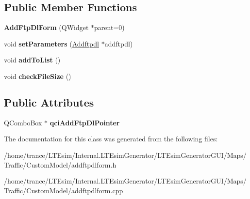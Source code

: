 \subsection*{Public Member Functions}
\begin{DoxyCompactItemize}
\item 
{\bfseries Add\+Ftp\+Dl\+Form} (Q\+Widget $\ast$parent=0)\hypertarget{class_add_ftp_dl_form_a13734697d4f55222183d448e6788f1ba}{}\label{class_add_ftp_dl_form_a13734697d4f55222183d448e6788f1ba}

\item 
void {\bfseries set\+Parameters} (\hyperlink{class_addftpdl}{Addftpdl} $\ast$addftpdl)\hypertarget{class_add_ftp_dl_form_a0243349a4ba5088cb57c56041c35bf27}{}\label{class_add_ftp_dl_form_a0243349a4ba5088cb57c56041c35bf27}

\item 
void {\bfseries add\+To\+List} ()\hypertarget{class_add_ftp_dl_form_af3bc20e8a30ab6d25b7c477ad017cb81}{}\label{class_add_ftp_dl_form_af3bc20e8a30ab6d25b7c477ad017cb81}

\item 
void {\bfseries check\+File\+Size} ()\hypertarget{class_add_ftp_dl_form_a761b18984d4fe04f02849a283b5af07d}{}\label{class_add_ftp_dl_form_a761b18984d4fe04f02849a283b5af07d}

\end{DoxyCompactItemize}
\subsection*{Public Attributes}
\begin{DoxyCompactItemize}
\item 
Q\+Combo\+Box $\ast$ {\bfseries qci\+Add\+Ftp\+Dl\+Pointer}\hypertarget{class_add_ftp_dl_form_aceb2a15b754c9e5f79099370fb01ec88}{}\label{class_add_ftp_dl_form_aceb2a15b754c9e5f79099370fb01ec88}

\end{DoxyCompactItemize}


The documentation for this class was generated from the following files\+:\begin{DoxyCompactItemize}
\item 
/home/trance/\+L\+T\+Esim/\+Internal.\+L\+T\+Esim\+Generator/\+L\+T\+Esim\+Generator\+G\+U\+I/\+Maps/\+Traffic/\+Custom\+Model/addftpdlform.\+h\item 
/home/trance/\+L\+T\+Esim/\+Internal.\+L\+T\+Esim\+Generator/\+L\+T\+Esim\+Generator\+G\+U\+I/\+Maps/\+Traffic/\+Custom\+Model/addftpdlform.\+cpp\end{DoxyCompactItemize}
